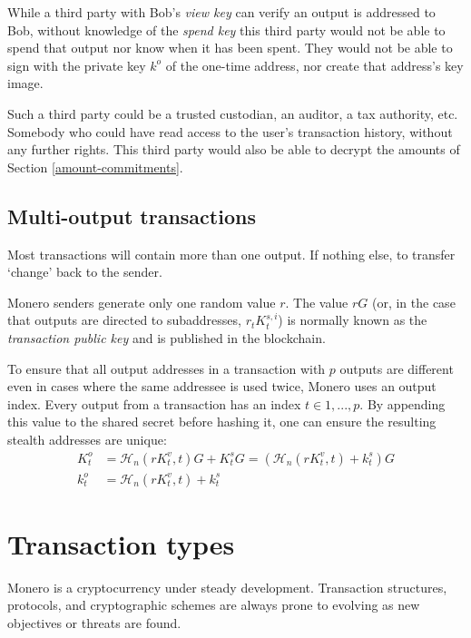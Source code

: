 While a third party with Bob’s {\em view key} can verify an output is addressed to Bob, without knowledge of the {\em spend key} this third party would not be able to spend that output nor know when it has been spent. They would not be able to sign with the private key $k^o$ of the one-time address, nor create that address's key image.

Such a third party could be a trusted custodian, an auditor, a tax authority, etc. Somebody who could have read access to the user’s transaction history, without any further rights. This third party would also be able to decrypt the amounts of Section \ref{amount-commitments}.


\subsection{Multi-output transactions}
\label{sec:multi_out_transactions}

Most transactions will contain more than one output. If nothing else, to transfer `change’ back to the sender.

Monero senders generate only one random value $r$. The value $r G$ (or, in the case that outputs are directed to subaddresses, $r_t K_t^{s,i}$) is normally known as the {\em transaction public key} and is published in the blockchain.

To ensure that all output addresses in a transaction with $p$ outputs are different even in cases where the same addressee is used twice, Monero uses an output index. Every output from a transaction has an index $t \in {1, ..., p}$. By appending this value to the shared secret before hashing it, one can ensure the resulting stealth addresses are unique:\\
\begin{align*}
  K_t^o &= \mathcal{H}_n(r K_t^v, t)G + K_t^s G = (\mathcal{H}_n(r K_t^v, t) + k_t^s)G  \\ 
  k_t^o &= \mathcal{H}_n(r K_t^v, t) + k_t^s
\end{align*} 


\newpage
\section{Transaction types}
\label{sec:transaction_types}

Monero is a cryptocurrency under steady development. Transaction structures, protocols, and cryptographic schemes are always prone to evolving as new objectives or threats are found.

